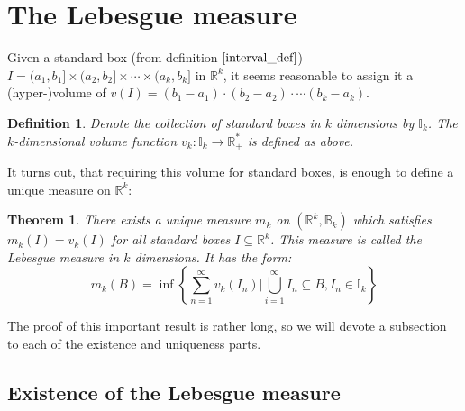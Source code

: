 \documentclass[12pt, a4paper]{article}
\newtheorem{theorem}{Theorem}[section]
\newtheorem{definition}{Definition}[section]
\numberwithin{equation}{section}
\begin{document}
\section{The Lebesgue measure}

Given a standard box (from definition $\ref{interval_def}$) $I=(a_1,b_1]\times(a_2,b_2]\times\cdots\times(a_k,b_k]$ in $\mathbb{R}^k$, it seems reasonable to assign it a (hyper-)volume of $v(I)=(b_1-a_1)\cdot(b_2-a_2)\cdot\cdots(b_k-a_k)$.

\begin{definition}
Denote the collection of standard boxes in $k$ dimensions by $\mathbb{I}_k$. The $k$-dimensional volume function $v_k: \mathbb{I}_k\rightarrow\mathbb{R}^*_+$ is defined as above.
\end{definition}

It turns out, that requiring this volume for standard boxes, is enough to define a unique measure on $\mathbb{R}^k$:

\begin{theorem}
There exists a unique measure $m_k$ on $(\mathbb{R}^k,\mathbb{B}_k)$ which satisfies $m_k(I)=v_k(I)$ for all standard boxes $I\subseteq\mathbb{R}^k$. This measure is called the Lebesgue measure in $k$ dimensions. It has the form:
\begin{equation}
\label{lebesgue_measure_definition}
m_k(B)=\inf\left\{\sum_{n=1}^\infty v_k(I_n)|\bigcup_{i=1}^\infty I_n\subseteq B, I_n\in\mathbb{I}_k\right\}
\end{equation}
\end{theorem}

The proof of this important result is rather long, so we will devote a subsection to each of the existence and uniqueness parts.

\subsection{Existence of the Lebesgue measure}
\end{document}
